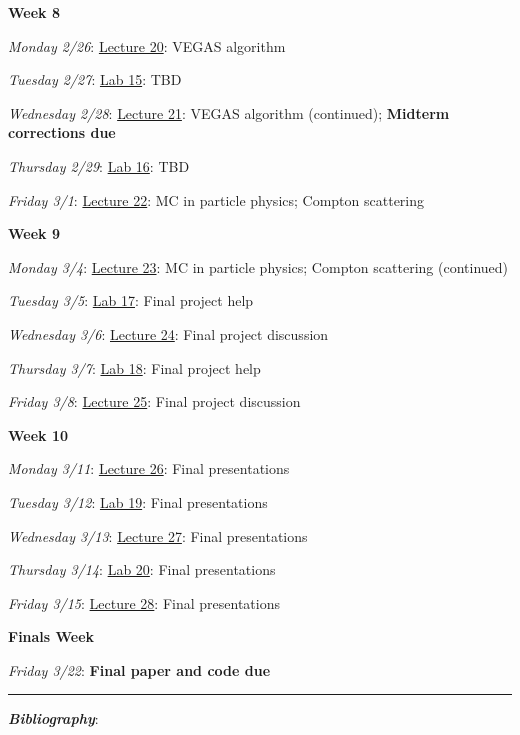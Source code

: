 \documentclass[12pt]{article}
\begin{document}
\noindent\textbf{Week 8}

\emph{Monday 2/26}: \underline{Lecture 20}: VEGAS algorithm

\emph{Tuesday 2/27}: \underline{Lab 15}: TBD

\emph{Wednesday 2/28}: \underline{Lecture 21}: VEGAS algorithm (continued); \textbf{Midterm corrections due}

\emph{Thursday 2/29}: \underline{Lab 16}: TBD

\emph{Friday 3/1}: \underline{Lecture 22}: MC in particle physics; Compton scattering

\noindent\textbf{Week 9}

\emph{Monday 3/4}: \underline{Lecture 23}: MC in particle physics; Compton scattering (continued)

\emph{Tuesday 3/5}: \underline{Lab 17}: Final project help

\emph{Wednesday 3/6}: \underline{Lecture 24}: Final project discussion

\emph{Thursday 3/7}: \underline{Lab 18}: Final project help

\emph{Friday 3/8}: \underline{Lecture 25}: Final project discussion

\noindent\textbf{Week 10}

\emph{Monday 3/11}: \underline{Lecture 26}: Final presentations

\emph{Tuesday 3/12}: \underline{Lab 19}: Final presentations

\emph{Wednesday 3/13}: \underline{Lecture 27}: Final presentations

\emph{Thursday 3/14}: \underline{Lab 20}: Final presentations

\emph{Friday 3/15}: \underline{Lecture 28}: Final presentations

\noindent\textbf{Finals Week}

\emph{Friday 3/22}: \textbf{Final paper and code due}

\begin{center}
  \rule{\textwidth}{0.5pt}
\end{center}
\nocite{*}

\noindent\textbf{\emph{Bibliography}}:\\
\printbibliography[heading=none]
\end{document}
